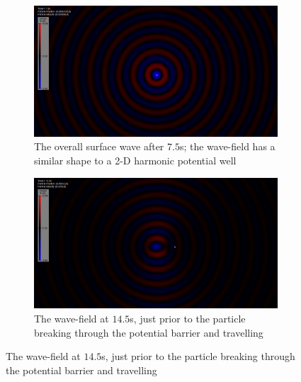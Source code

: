 \begin{figure}
	\begin{subfigure}{0.475\textwidth}
		\includegraphics[width=\textwidth]{simulation/highmemory/wavefield75.png}
		\caption{The overall surface wave after $7.5$s; the wave-field has a similar shape to a 2-D harmonic potential well}
		\label{fig:mem:wavefield75}
	\end{subfigure}
	\hfill
	\begin{subfigure}{0.475\textwidth}
		\includegraphics[width=\textwidth]{simulation/highmemory/wavefield145.png}
		\caption{The wave-field at $14.5$s, just prior to the particle breaking through the potential barrier and travelling}
		\label{fig:mem:wavefield145}
	\end{subfigure}
	

\end{figure}
